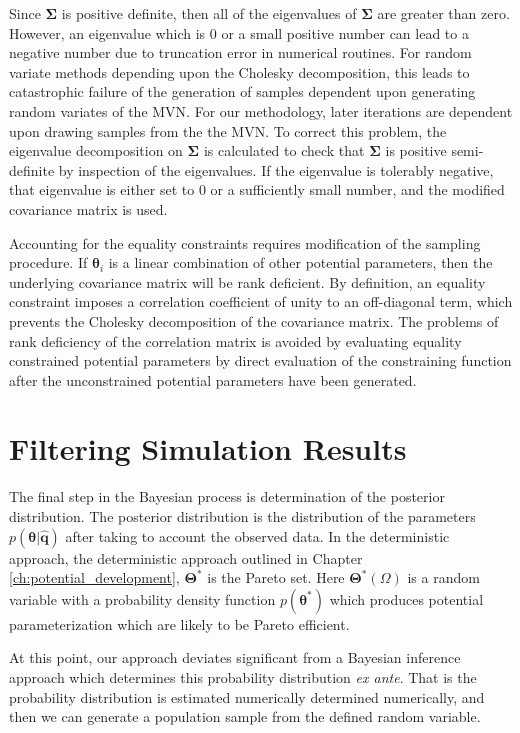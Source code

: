 Since $\bm{\Sigma}$ is positive definite, then all of the eigenvalues of $\bm{\Sigma}$ are greater than zero.  However, an eigenvalue which is 0 or a small positive number can lead to a negative number due to truncation error in numerical routines.  For random variate methods depending upon the Cholesky decomposition, this leads to catastrophic failure of the generation of samples dependent upon generating random variates of the MVN.  For our methodology, later iterations are dependent upon drawing samples from the the MVN.  To correct this problem, the eigenvalue decomposition on $\bm{\Sigma}$ is calculated to check that $\bm{\Sigma}$ is positive semi-definite by inspection of the eigenvalues.  If the eigenvalue is tolerably negative, that eigenvalue is either set to $0$ or a sufficiently small number, and the modified covariance matrix is used.

Accounting for the equality constraints requires modification of the sampling procedure.  If $\bm{\theta}_i$ is a linear combination of other potential parameters, then the underlying covariance matrix will be rank deficient.  By definition, an equality constraint imposes a correlation coefficient of unity to an off-diagonal term, which prevents the Cholesky decomposition of the covariance matrix.  The problems of rank deficiency of the correlation matrix is avoided by evaluating equality constrained potential parameters by direct evaluation of the constraining function after the unconstrained potential parameters have been generated.

\section{Filtering Simulation Results}
\label{sec:filtering}

The final step in the Bayesian process is determination of the posterior distribution.  The posterior distribution is the distribution of the parameters $p(\bm{\theta}|\hat{\bm{q}})$ after taking to account the observed data.  In the deterministic approach, the deterministic approach outlined in Chapter \ref{ch:potential_development}, $\bm{\Theta}^*$ is the Pareto set.  Here $\bm{\Theta}^*(\Omega)$ is a random variable with a probability density function $p(\bm{\theta}^*)$ which produces potential parameterization which are likely to be Pareto efficient.

At this point, our approach deviates significant from a Bayesian inference approach which determines this probability distribution \emph{ex ante}.  That is the probability distribution is estimated numerically determined numerically, and then we can generate a population sample from the defined random variable.

